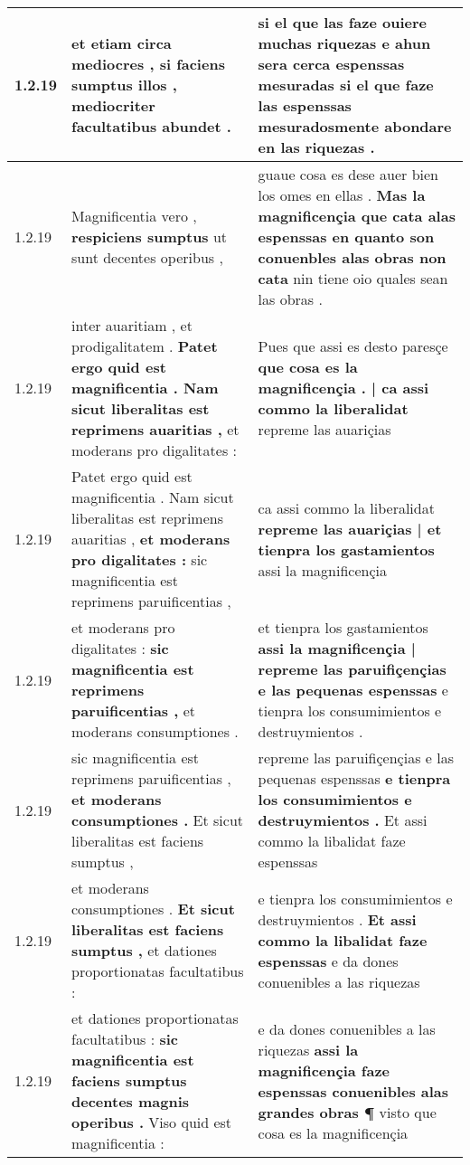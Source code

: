 \begin{tabular}{|p{1cm}|p{6.5cm}|p{6.5cm}|}
1.2.19 & et etiam circa mediocres , \textbf{ si faciens sumptus illos , } mediocriter facultatibus abundet . & si el que las faze ouiere muchas riquezas \textbf{ e ahun sera cerca espenssas mesuradas si el que faze las espenssas } mesuradosmente abondare en las riquezas . \\\hline
1.2.19 & Magnificentia vero , \textbf{ respiciens sumptus } ut sunt decentes operibus , & guaue cosa es dese auer bien los omes en ellas . \textbf{ Mas la magnificençia que cata alas espenssas en quanto son conuenbles alas obras non cata } nin tiene oio quales sean las obras . \\\hline
1.2.19 & inter auaritiam , et prodigalitatem . \textbf{ Patet ergo quid est magnificentia . Nam sicut liberalitas est reprimens auaritias , } et moderans pro digalitates : & Pues que assi es desto paresçe \textbf{ que cosa es la magnificençia . | ca assi commo la liberalidat } repreme las auariçias \\\hline
1.2.19 & Patet ergo quid est magnificentia . Nam sicut liberalitas est reprimens auaritias , \textbf{ et moderans pro digalitates : } sic magnificentia est reprimens paruificentias , & ca assi commo la liberalidat \textbf{ repreme las auariçias | et tienpra los gastamientos } assi la magnificençia \\\hline
1.2.19 & et moderans pro digalitates : \textbf{ sic magnificentia est reprimens paruificentias , } et moderans consumptiones . & et tienpra los gastamientos \textbf{ assi la magnificençia | repreme las paruifiçençias e las pequenas espenssas } e tienpra los consumimientos e destruymientos . \\\hline
1.2.19 & sic magnificentia est reprimens paruificentias , \textbf{ et moderans consumptiones . } Et sicut liberalitas est faciens sumptus , & repreme las paruifiçençias e las pequenas espenssas \textbf{ e tienpra los consumimientos e destruymientos . } Et assi commo la libalidat faze espenssas \\\hline
1.2.19 & et moderans consumptiones . \textbf{ Et sicut liberalitas est faciens sumptus , } et dationes proportionatas facultatibus : & e tienpra los consumimientos e destruymientos . \textbf{ Et assi commo la libalidat faze espenssas } e da dones conuenibles a las riquezas \\\hline
1.2.19 & et dationes proportionatas facultatibus : \textbf{ sic magnificentia est faciens sumptus decentes magnis operibus . } Viso quid est magnificentia : & e da dones conuenibles a las riquezas \textbf{ assi la magnificençia faze espenssas conuenibles alas grandes obras ¶ } visto que cosa es la magnificençia \\\hline

\end{tabular}
